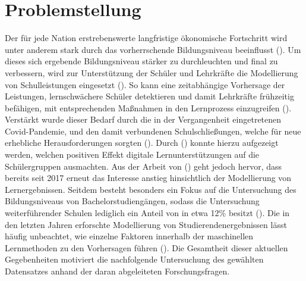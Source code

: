 \chapter[Problemstellung]{Problemstellung}

Der für jede Nation erstrebenswerte langfristige ökonomische Fortschritt wird unter anderem stark durch das vorherrschende Bildungsniveau beeinflusst (\cite[S. 1]{Cortez2008UsingDM}). 
Um dieses sich ergebende Bildungsniveau stärker zu durchleuchten und final zu verbessern, wird zur Unterstützung der Schüler und Lehrkräfte die Modellierung von Schulleistungen eingesetzt (\cite[S. 1]{Cortez2008UsingDM}).
So kann eine zeitabhängige Vorhersage der Leistungen, lernschwächere Schüler detektieren und damit Lehrkräfte frühzeitig befähigen, mit entsprechenden Maßnahmen in den Lernprozess einzugreifen (\cite[S. 2]{Namoun.2021}).
Verstärkt wurde dieser Bedarf durch die in der Vergangenheit eingetretenen Covid-Pandemie, und den damit verbundenen Schulschließungen, welche für neue erhebliche Herausforderungen sorgten (\cite[S. 2]{Clark.2021}).
Durch (\cite[S. 13]{Clark.2021}) konnte hierzu aufgezeigt werden, welchen positiven Effekt digitale Lernunterstützungen auf die Schülergruppen ausmachten.
Aus der Arbeit von (\cite[S. 9]{Namoun.2021}) geht jedoch hervor, dass bereits seit 2017 erneut das Interesse anstieg hinsichtlich der Modellierung von Lernergebnissen.
Seitdem besteht besonders ein Fokus auf die Untersuchung des Bildungsniveaus von Bachelorstudiengängen, sodass die Untersuchung weiterführender Schulen lediglich ein Anteil von in etwa 12\% besitzt (\cite[S. 11]{Namoun.2021}).
Die in den letzten Jahren erforschte Modellierung von Studierendenergebnissen lässt häufig unbeachtet, wie einzelne Faktoren innerhalb der maschinellen Lernmethoden zu den Vorhersagen führen (\cite[S. 19]{Namoun.2021}).
Die Gesamtheit dieser aktuellen Gegebenheiten motiviert die nachfolgende Untersuchung des gewählten Datensatzes anhand der daran abgeleiteten Forschungsfragen.